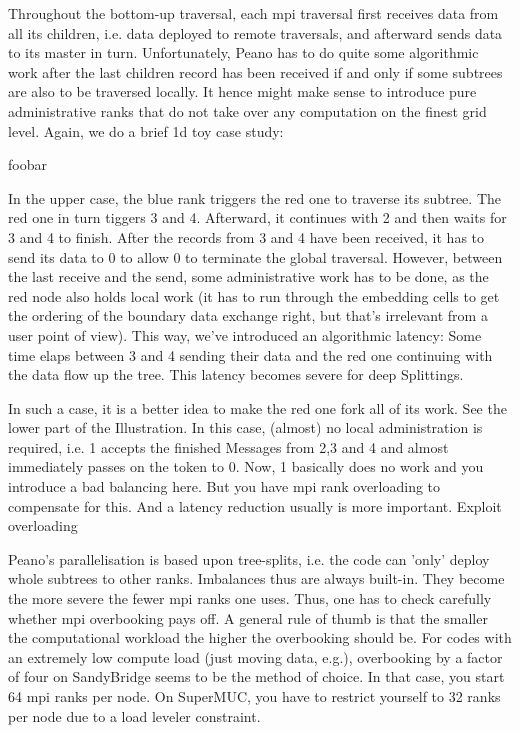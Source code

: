 Throughout the bottom-up traversal, each mpi traversal first receives data from all its children, i.e. data deployed to remote traversals, and afterward sends data to its master in turn. Unfortunately, Peano has to do quite some algorithmic work after the last children record has been received if and only if some subtrees are also to be traversed locally. It hence might make sense to introduce pure administrative ranks that do not take over any computation on the finest grid level. Again, we do a brief 1d toy case study:

foobar

In the upper case, the blue rank triggers the red one to traverse its subtree. The red one in turn tiggers 3 and 4. Afterward, it continues with 2 and then waits for 3 and 4 to finish. After the records from 3 and 4 have been received, it has to send its data to 0 to allow 0 to terminate the global traversal. However, between the last receive and the send, some administrative work has to be done, as the red node also holds local work (it has to run through the embedding cells to get the ordering of the boundary data exchange right, but that's irrelevant from a user point of view). This way, we've introduced an algorithmic latency: Some time elaps between 3 and 4 sending their data and the red one continuing with the data flow up the tree. This latency becomes severe for deep Splittings.

In such a case, it is a better idea to make the red one fork all of its work. See the lower part of the Illustration. In this case, (almost) no local administration is required, i.e. 1 accepts the finished Messages from 2,3 and 4 and almost immediately passes on the token to 0. Now, 1 basically does no work and you introduce a bad balancing here. But you have mpi rank overloading to compensate for this. And a latency reduction usually is more important.
Exploit overloading

Peano's parallelisation is based upon tree-splits, i.e. the code can 'only' deploy whole subtrees to other ranks. Imbalances thus are always built-in. They become the more severe the fewer mpi ranks one uses. Thus, one has to check carefully whether mpi overbooking pays off. A general rule of thumb is that the smaller the computational workload the higher the overbooking should be. For codes with an extremely low compute load (just moving data, e.g.), overbooking by a factor of four on SandyBridge seems to be the method of choice. In that case, you start 64 mpi ranks per node. On SuperMUC, you have to restrict yourself to 32 ranks per node due to a load leveler constraint.


